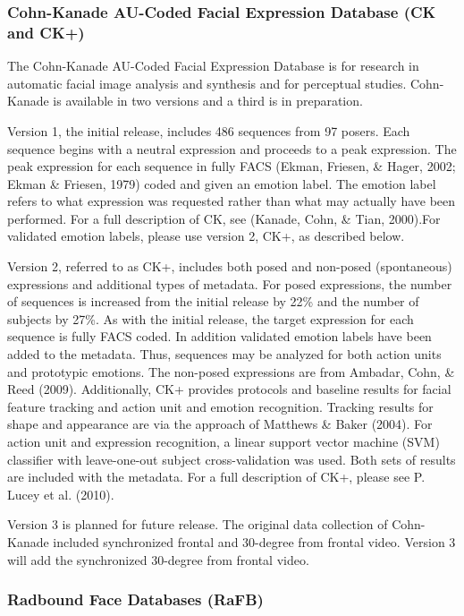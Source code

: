 \subsubsection{Cohn-Kanade AU-Coded Facial Expression Database (CK and CK+)}

{\color{Orchid} The Cohn-Kanade AU-Coded Facial Expression Database
is for research in automatic facial image analysis and synthesis and
for perceptual studies. Cohn-Kanade is available in two versions and a
third is in preparation.

Version 1, the initial release, includes 486 sequences from 97 posers.
Each sequence begins with a neutral expression and proceeds to a peak
 expression. The peak expression for each sequence in fully FACS (Ekman,
 Friesen, \& Hager, 2002; Ekman \& Friesen, 1979) coded and given an
 emotion label. The emotion label refers to what expression was requested
 rather than what may actually have been performed. For a full description
 of CK, see (Kanade, Cohn, \& Tian, 2000).For validated emotion labels,
 please use version 2, CK+, as described below.

Version 2, referred to as CK+, includes both posed and non-posed
(spontaneous) expressions and additional types of metadata. For posed
expressions, the number of sequences is increased from the initial
release by 22\% and the number of subjects by 27\%. As with the initial
release, the target expression for each sequence is fully FACS coded.
In addition validated emotion labels have been added to the metadata.
Thus, sequences may be analyzed for both action units and prototypic
emotions. The non-posed expressions are from Ambadar, Cohn, \& Reed
(2009). Additionally, CK+ provides protocols and baseline results for
facial feature tracking and action unit and emotion recognition.
Tracking results for shape and appearance are via the approach of
Matthews \& Baker (2004). For action unit and expression recognition,
a linear support vector machine (SVM) classifier with leave-one-out
subject cross-validation was used. Both sets of results are included
with the metadata. For a full description of CK+, please see P. Lucey
et al. (2010).

Version 3 is planned for future release. The original data collection
of Cohn-Kanade included synchronized frontal and 30-degree from frontal
video. Version 3 will add the synchronized 30-degree from frontal video.
}
\citep{Kanade2000, Lucey2010}


\subsubsection{Radbound Face Databases (RaFB)}

